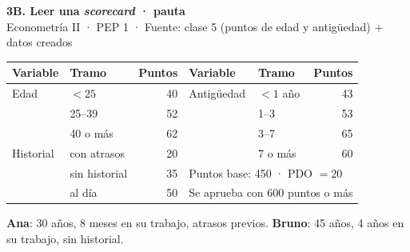 \documentclass[11pt,a4paper]{article}
\begin{document}
\begin{center}
{\Large\bfseries 3B. Leer una \emph{scorecard} · pauta}\\[2pt]
Econometría II · PEP 1 · Fuente: clase 5 (puntos de edad y antigüedad) + datos creados
\end{center}

\begin{center}\small
\renewcommand{\arraystretch}{1.3}
\begin{tabular}{llr|llr}\toprule
Variable & Tramo & Puntos & Variable & Tramo & Puntos\\\midrule
Edad & $<25$ & 40 & Antigüedad & $<1$ año & 43\\
 & 25--39 & 52 & & 1--3 & 53\\
 & 40 o más & 62 & & 3--7 & 65\\
Historial & con atrasos & 20 & & 7 o más & 60\\
 & sin historial & 35 & \multicolumn{3}{l}{Puntos base: 450 · PDO $=20$}\\
 & al día & 50 & \multicolumn{3}{l}{Se aprueba con 600 puntos o más}\\\bottomrule
\end{tabular}
\end{center}
\noindent\textbf{Ana}: 30 años, 8 meses en su trabajo, atrasos previos. \textbf{Bruno}: 45 años, 4 años en su trabajo, sin historial.

\end{document}
